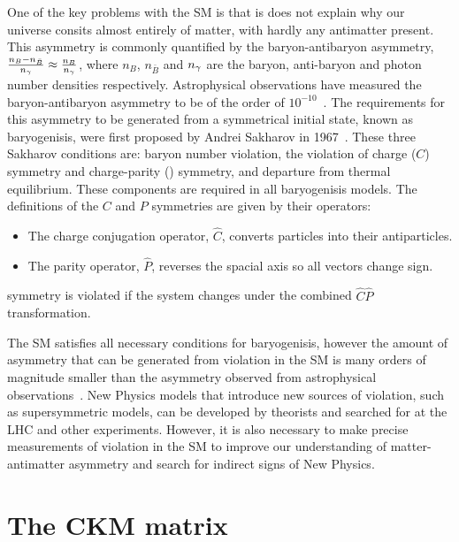 One of the key problems with the SM is that is does not explain why our universe consits almost entirely of matter, with hardly any antimatter present. This asymmetry is commonly quantified by the baryon-antibaryon asymmetry, $\frac{n_{B} - n_{\bar{B}}}{n_{{\gamma}}} \approx \frac{n_{B}}{n_{{\gamma}}}$, where $n_{B}$, $n_{\bar{B}}$ and $n_{{\gamma}}$ are the baryon, anti-baryon and photon number densities respectively. Astrophysical observations have measured the baryon-antibaryon asymmetry to be of the order of $10^{-10}$~\cite{astrophysicalasy}. The requirements for this asymmetry to be generated from a symmetrical initial state, known as baryogenisis, were first proposed by Andrei Sakharov in 1967~\cite{sakharov}. These three Sakharov conditions are: baryon number violation, the violation of charge ($C$) symmetry and charge-parity (\CP) symmetry, and departure from thermal equilibrium. These components are required in all baryogenisis models. The definitions of the $C$ and $P$ symmetries are given by their operators:
\begin{itemize}
\item The charge conjugation operator, $\hat{C}$, converts particles into their antiparticles.
\item The parity operator, $\hat{P}$, reverses the spacial axis so all vectors change sign.
\end{itemize}
\CP symmetry is violated if the system changes under the combined $\hat{C}\hat{P}$ transformation.

The SM satisfies all necessary conditions for baryogenisis, however the amount of asymmetry that can be generated from \CP violation in the SM is many orders of magnitude smaller than the asymmetry observed from astrophysical observations~\cite{SMasy}. New Physics models that introduce new sources of \CP violation{\color{red}{[ref]}}, such as supersymmetric models, can be developed by theorists and searched for at the LHC and other experiments. However, it is also necessary to make precise measurements of \CP violation in the SM to improve our understanding of matter-antimatter asymmetry and search for indirect signs of New Physics.


\section{The CKM matrix}

